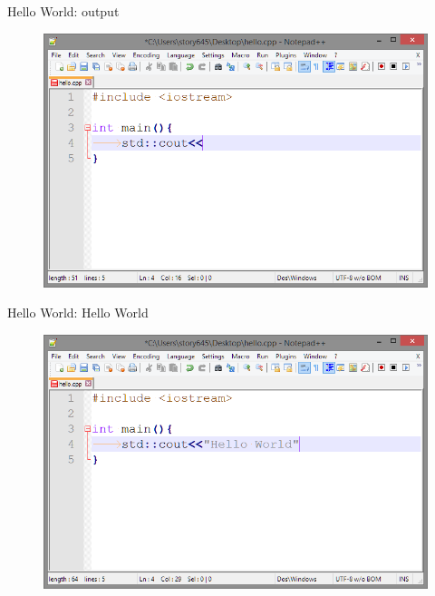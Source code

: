\documentclass[xcolor={dvipsnames}]{beamer}
\begin{document}
\begin{frame}{Hello World: output}
	\begin{figure}
			\includegraphics[width=1\textwidth]{cout}
	\end{figure}
\end{frame}

\begin{frame}{Hello World: Hello World}
	\begin{figure}
			\includegraphics[width=1\textwidth]{hello}
	\end{figure}
\end{frame}
\end{document}

